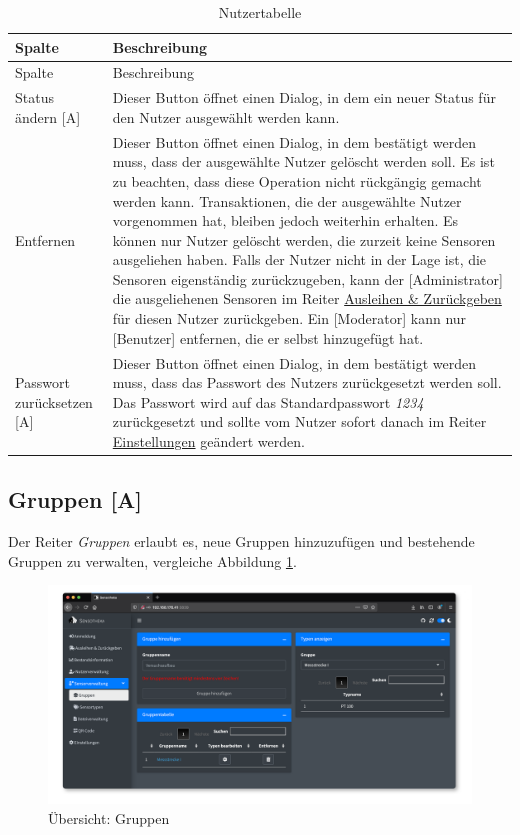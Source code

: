 \documentclass[
]{article}
\begin{document}
\begin{longtable}[]{@{}
  >{\raggedright\arraybackslash}p{}
  >{\raggedright\arraybackslash}p{}@{}}
\caption{\label{tab:user-table} Nutzertabelle}\tabularnewline
\toprule
Spalte & Beschreibung \\
\midrule
\endfirsthead
\toprule
Spalte & Beschreibung \\
\midrule
\endhead
Status ändern {[}A{]} & Dieser Button öffnet einen Dialog, in dem ein neuer Status für den Nutzer ausgewählt werden kann. \\
Entfernen & Dieser Button öffnet einen Dialog, in dem bestätigt werden muss, dass der ausgewählte Nutzer gelöscht werden soll. Es ist zu beachten, dass diese Operation nicht rückgängig gemacht werden kann. Transaktionen, die der ausgewählte Nutzer vorgenommen hat, bleiben jedoch weiterhin erhalten. Es können nur Nutzer gelöscht werden, die zurzeit keine Sensoren ausgeliehen haben. Falls der Nutzer nicht in der Lage ist, die Sensoren eigenständig zurückzugeben, kann der {[}Administrator{]} die ausgeliehenen Sensoren im Reiter \protect\hyperlink{operate}{Ausleihen \& Zurückgeben} für diesen Nutzer zurückgeben. Ein {[}Moderator{]} kann nur {[}Benutzer{]} entfernen, die er selbst hinzugefügt hat. \\
Passwort zurücksetzen {[}A{]} & Dieser Button öffnet einen Dialog, in dem bestätigt werden muss, dass das Passwort des Nutzers zurückgesetzt werden soll. Das Passwort wird auf das Standardpasswort \emph{1234} zurückgesetzt und sollte vom Nutzer sofort danach im Reiter \protect\hyperlink{settings}{Einstellungen} geändert werden. \\
\bottomrule
\end{longtable}

\hypertarget{group}{%
\subsection{Gruppen {[}A{]}}\label{group}}

Der Reiter \emph{Gruppen} erlaubt es, neue Gruppen hinzuzufügen und bestehende Gruppen zu verwalten, vergleiche Abbildung \ref{fig:group-overview}.

\begin{figure}
\centering
\includegraphics{./img/group_overview.png}
\caption{\label{fig:group-overview}Übersicht: Gruppen}
\end{figure}
\end{document}

